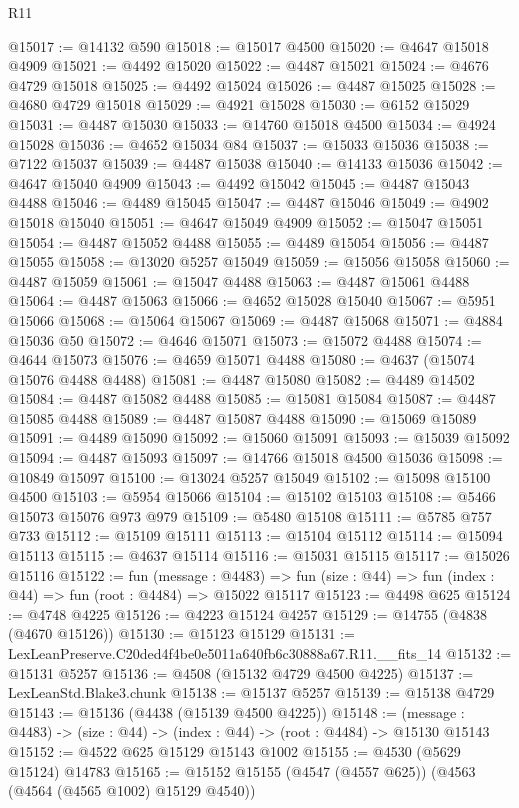 \begin{lexlean}{R11}
\begin{coremodule}
@15017 := @14132 @590
@15018 := @15017 @4500
@15020 := @4647 @15018 @4909
@15021 := @4492 @15020
@15022 := @4487 @15021
@15024 := @4676 @4729 @15018
@15025 := @4492 @15024
@15026 := @4487 @15025
@15028 := @4680 @4729 @15018
@15029 := @4921 @15028
@15030 := @6152 @15029
@15031 := @4487 @15030
@15033 := @14760 @15018 @4500
@15034 := @4924 @15028
@15036 := @4652 @15034 @84
@15037 := @15033 @15036
@15038 := @7122 @15037
@15039 := @4487 @15038
@15040 := @14133 @15036
@15042 := @4647 @15040 @4909
@15043 := @4492 @15042
@15045 := @4487 @15043 @4488
@15046 := @4489 @15045
@15047 := @4487 @15046
@15049 := @4902 @15018 @15040
@15051 := @4647 @15049 @4909
@15052 := @15047 @15051
@15054 := @4487 @15052 @4488
@15055 := @4489 @15054
@15056 := @4487 @15055
@15058 := @13020 @5257 @15049
@15059 := @15056 @15058
@15060 := @4487 @15059
@15061 := @15047 @4488
@15063 := @4487 @15061 @4488
@15064 := @4487 @15063
@15066 := @4652 @15028 @15040
@15067 := @5951 @15066
@15068 := @15064 @15067
@15069 := @4487 @15068
@15071 := @4884 @15036 @50
@15072 := @4646 @15071
@15073 := @15072 @4488
@15074 := @4644 @15073
@15076 := @4659 @15071 @4488
@15080 := @4637 (@15074 @15076 @4488 @4488)
@15081 := @4487 @15080
@15082 := @4489 @14502
@15084 := @4487 @15082 @4488
@15085 := @15081 @15084
@15087 := @4487 @15085 @4488
@15089 := @4487 @15087 @4488
@15090 := @15069 @15089
@15091 := @4489 @15090
@15092 := @15060 @15091
@15093 := @15039 @15092
@15094 := @4487 @15093
@15097 := @14766 @15018 @4500 @15036
@15098 := @10849 @15097
@15100 := @13024 @5257 @15049
@15102 := @15098 @15100 @4500
@15103 := @5954 @15066
@15104 := @15102 @15103
@15108 := @5466 @15073 @15076 @973 @979
@15109 := @5480 @15108
@15111 := @5785 @757 @733
@15112 := @15109 @15111
@15113 := @15104 @15112
@15114 := @15094 @15113
@15115 := @4637 @15114
@15116 := @15031 @15115
@15117 := @15026 @15116
@15122 := fun (message : @4483) =>
  fun (size : @44) => fun (index : @44) => fun (root : @4484) => @15022 @15117
@15123 := @4498 @625
@15124 := @4748 @4225
@15126 := @4223 @15124 @4257
@15129 := @14755 (@4838 (@4670 @15126))
@15130 := @15123 @15129
@15131 := LexLeanPreserve.C20ded4f4be0e5011a640fb6c30888a67.R11.__fits_14
@15132 := @15131 @5257
@15136 := @4508 (@15132 @4729 @4500 @4225)
@15137 := LexLeanStd.Blake3.chunk
@15138 := @15137 @5257
@15139 := @15138 @4729
@15143 := @15136 (@4438 (@15139 @4500 @4225))
@15148 := (message : @4483) -> (size : @44) -> (index : @44) -> (root : @4484) -> @15130 @15143
@15152 := @4522 @625 @15129 @15143 @1002
@15155 := @4530 (@5629 @15124) @14783
@15165 := @15152 @15155 (@4547 (@4557 @625)) (@4563 (@4564 (@4565 @1002) @15129 @4540))

\end{coremodule}
\end{lexlean}
